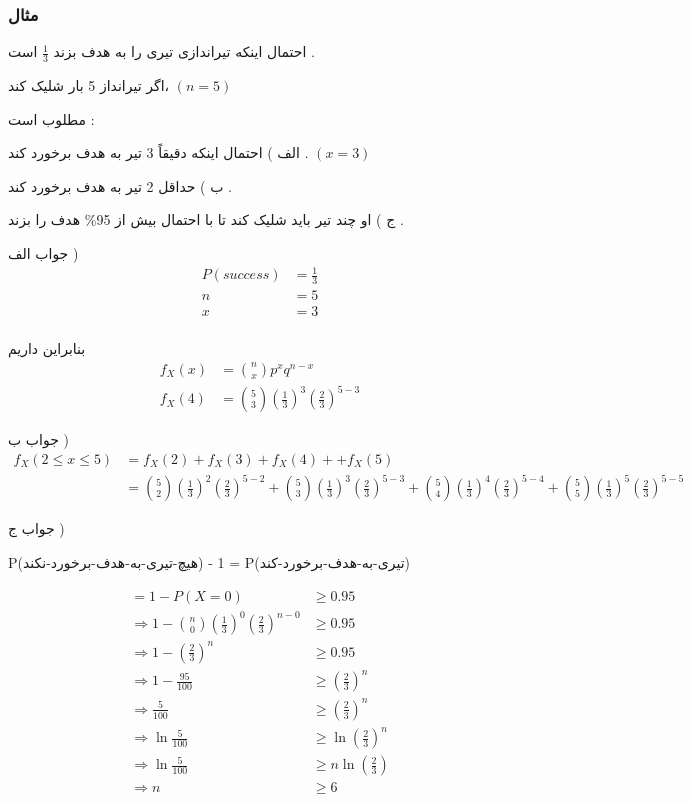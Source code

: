 \documentclass[12pt]{book}
\begin{document}
\subsubsection{مثال}
احتمال اینکه تیراندازی تیری را به هدف بزند 
$\frac{1}{3}$
است .

اگر تیرانداز 5 بار شلیک کند، 
$(n = 5)$

مطلوب است :

الف ) احتمال اینکه دقیقاً 3 تیر به هدف برخورد کند . 
$(x = 3)$

ب ) حداقل 2 تیر به هدف برخورد کند .

ج ) او چند تیر باید شلیک کند تا با احتمال بیش از 95\% هدف را بزند .

جواب الف )
\begin{align*}
P(success) &= \frac{1}{3} \\
n &= 5 \\
x &= 3 \\
\end{align*}

بنابراین داریم
\begin{align*}
f_{X}(x) &= \binom{n}{x} p^{x} q^{n-x} \\
f_{X}(4) &= \binom{5}{3} (\frac{1}{3})^{3} (\frac{2}{3})^{5-3}
\end{align*}


جواب ب )
\begin{align*}
f_{X}(2 \leq x \leq 5) &= f_{X}(2) + f_{X}(3) + f_{X}(4) + + f_{X}(5) \\
&= \binom{5}{2} (\frac{1}{3})^{2} (\frac{2}{3})^{5-2} + \binom{5}{3} (\frac{1}{3})^{3} (\frac{2}{3})^{5-3} + \binom{5}{4} (\frac{1}{3})^{4} (\frac{2}{3})^{5-4} + \binom{5}{5} (\frac{1}{3})^{5} (\frac{2}{3})^{5-5}
\end{align*}

جواب ج )


P(هیچ-تیری-به-هدف-برخورد-نکند) - 1
= P(تیری-به-هدف-برخورد-کند) 

\begin{align*}
= 1 - P(X=0) &\geq 0.95 \\
\Rightarrow 1 - \binom{n}{0} (\frac{1}{3})^{0} (\frac{2}{3})^{n-0} &\geq 0.95 \\
\Rightarrow  1 - (\frac{2}{3})^{n} &\geq 0.95 \\
\Rightarrow 1 - \frac{95}{100} &\geq (\frac{2}{3})^{n} \\
\Rightarrow \frac{5}{100} &\geq  (\frac{2}{3})^{n} \\
\Rightarrow \ln{\frac{5}{100}} &\geq \ln{(\frac{2}{3})^{n}} \\
\Rightarrow \ln{\frac{5}{100}} &\geq n\ln{(\frac{2}{3})} \\
\Rightarrow n &\geq 6
\end{align*}
\end{document}
